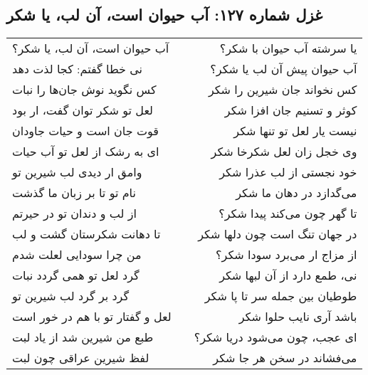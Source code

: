 \begin{center}
\section*{غزل شماره ۱۲۷: آب حیوان است، آن لب، یا شکر}
\label{sec:127}
\begin{longtable}{l p{0.5cm} r}
آب حیوان است، آن لب، یا شکر؟
&&
یا سرشته آب حیوان با شکر؟
\\
نی خطا گفتم: کجا لذت دهد
&&
آب حیوان پیش آن لب یا شکر؟
\\
کس نگوید نوش جان‌ها را نبات
&&
کس نخواند جان شیرین را شکر
\\
لعل تو شکر توان گفت، ار بود
&&
کوثر و تسنیم جان افزا شکر
\\
قوت جان است و حیات جاودان
&&
نیست یار لعل تو تنها شکر
\\
ای به رشک از لعل تو آب حیات
&&
وی خجل زان لعل شکرخا شکر
\\
وامق ار دیدی لب شیرین تو
&&
خود نجستی از لب عذرا شکر
\\
نام تو تا بر زبان ما گذشت
&&
می‌گدازد در دهان ما شکر
\\
از لب و دندان تو در حیرتم
&&
تا گهر چون می‌کند پیدا شکر؟
\\
تا دهانت شکرستان گشت و لب
&&
در جهان تنگ است چون دلها شکر
\\
من چرا سودایی لعلت شدم
&&
از مزاج ار می‌برد سودا شکر؟
\\
گرد لعل تو همی گردد نبات
&&
نی، طمع دارد از آن لبها شکر
\\
گرد بر گرد لب شیرین تو
&&
طوطیان بین جمله سر تا پا شکر
\\
لعل و گفتار تو با هم در خور است
&&
باشد آری نایب حلوا شکر
\\
طبع من شیرین شد از یاد لبت
&&
ای عجب، چون می‌شود دریا شکر؟
\\
لفظ شیرین عراقی چون لبت
&&
می‌فشاند در سخن هر جا شکر
\\
\end{longtable}
\end{center}
